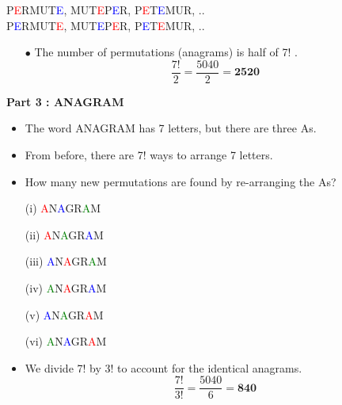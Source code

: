 \documentclass[12pt]{report}
\begin{document}
	\begin{center}
		P\textcolor{red}{E}RMUT\textcolor{blue}{E}, \; MUT\textcolor{red}{E}P\textcolor{blue}{E}R, \; P\textcolor{red}{E}T\textcolor{blue}{E}MUR,\; ..\\
		P\textcolor{blue}{E}RMUT\textcolor{red}{E}, \; MUT\textcolor{blue}{E}P\textcolor{red}{E}R, \; P\textcolor{blue}{E}T\textcolor{red}{E}MUR,\; ..
	\end{center}
	

	\begin{itemize}
		\item[$\bullet$]  The number of permutations (anagrams) is half of 7! .
		\LARGE
		\[\frac{7!}{2} =  \frac{5040}{2} = \boldsymbol{2520} \]
	\end{itemize}

	\newpage
	\textbf{Part 3 : ANAGRAM}\\
	\begin{itemize}
		\item The word ANAGRAM has 7 letters, but there are three As.
		\item From before, there are 7! ways to arrange 7 letters.
		\item How many new permutations are found by re-arranging the As?
	\end{itemize}
	\LARGE
	\begin{multicols}{2}
	\begin{itemize}
		\item[(i)]	\textcolor{red}{A}N\textcolor{blue}{A}GR\textcolor{green}{A}M 
		\item[(ii)]		\textcolor{red}{A}N\textcolor{green}{A}GR\textcolor{blue}{A}M 
		\item[(iii)] 		\textcolor{blue}{A}N\textcolor{red}{A}GR\textcolor{green}{A}M  
		\item[(iv)]		\textcolor{green}{A}N\textcolor{red}{A}GR\textcolor{blue}{A}M 
		\item[(v)]	\textcolor{blue}{A}N\textcolor{green}{A}GR\textcolor{red}{A}M 
		\item[(vi)]		\textcolor{green}{A}N\textcolor{blue}{A}GR\textcolor{red}{A}M 
	\end{itemize}
	\end{multicols}

	
	\vspace{0.2cm}

	\begin{itemize}
		\item We divide 7! by 3! to account for the identical anagrams.
		\LARGE
		\[\frac{7!}{3!} =  \frac{5040}{6} = \boldsymbol{840} \]
	\end{itemize}
	
\end{document}
